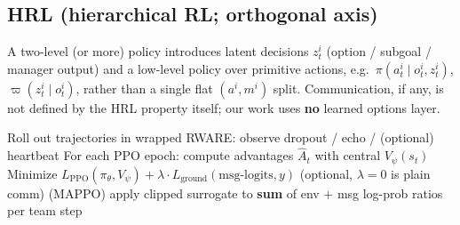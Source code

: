 \documentclass[11pt]{article}
\begin{document}
\subsection*{HRL (hierarchical RL; orthogonal axis)}
A two-level (or more) policy introduces latent decisions $z^i_t$ (option / subgoal /
manager output) and a low-level policy over primitive actions, e.g.\
$\pi(a^i_t\mid o^i_t, z^i_t)$, $\varpi(z^i_t\mid o^i_t)$, rather than a single
flat $(a^i,m^i)$ split. Communication, if any, is not defined by the HRL property itself;
our work uses \textbf{no} learned options layer.

\bigskip
\begin{algorithm}[h]
\caption{Training step (Ours) --- sketch}
\begin{algorithmic}[1]
\State Roll out trajectories in wrapped RWARE: observe dropout / echo / (optional) heartbeat
\State For each PPO epoch: compute advantages $\hat A_t$ with central $V_\psi(s_t)$
\State Minimize
  $L_{\mathrm{PPO}}(\pi_\theta, V_\psi)
   + \lambda \cdot L_{\mathrm{ground}}(\text{msg-logits}, y)$ \hfill (optional, $\lambda{=}0$ is plain comm)
\State (MAPPO) apply clipped surrogate to \textbf{sum} of env + msg log-prob ratios per team step
\end{algorithmic}
\end{algorithm}
\end{document}
